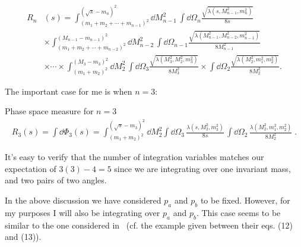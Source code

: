 \begin{equation}
\begin{aligned}
    R_n&(s) 
        = 
    \int_{(m_1 + m_2 + \cdots + m_{n-1})^2}^{(\sqrt{s} - m_n)^2}
    \dd M^2_{n-1} \,  \int \dd \Omega_n
    \frac{\sqrt{\lambda(s, M_{n-1}^2, m_n^2)}}{8s} \\
        &\times 
    \int_{(m_1 + m_2 + \cdots + m_{n-2})^2}^{(M_{n-1} - m_{n-1})^2}
    \dd M^2_{n-2}  \, \int \dd \Omega_{n-1}
    \frac{\sqrt{\lambda(M_{n-1}^2, M_{n-2}^2, m_{n-1}^2)}}{8M_{n-1}^2} \\
        &\times \cdots \times
    \int_{(m_1 + m_2)^2}^{(M_3 - m_3)^2}
    \dd M^2_{2}  \, \int \dd \Omega_{3}
    \frac{\sqrt{\lambda(M_{3}^2, M_{2}^2, m_{3}^2)}}{8M_{3}^2} 
    \times 
    \int \dd \Omega_2
    \frac{\sqrt{\lambda(M_{2}^2, m_1^2, m_{2}^2)}}{8M_{2}^2}. 
\end{aligned}
\end{equation}

The important case for me is when $n = 3$:
\begin{bluenv}{Phase space measure for $n = 3$}
\begin{equation}
    \label{eq:recursive-LIPS-3}
\begin{aligned}
    R_3(s) = \int \dd \Phi_3(s) = 
        \int_{(m_1 + m_2)^2}^{(\sqrt{s} - m_3)^2} \dd M_{2}^2 
        \int \dd \Omega_3 \,
        \frac{\lambda (s, M^2_{2}, m_3^2)}{8s} \,
        \int \dd \Omega_2 \,
        \frac{\lambda (M^2_2, m_1^2, m_2^2)}{8 M_2^2} \; .
\end{aligned}
\end{equation}
\end{bluenv}
It's easy to verify that the number of integration variables matches our expectation of $3(3) - 4 = 5$ since we are integrating over one invariant mass, and two pairs of two angles. 

In the above discussion we have considered $p_a$ and $p_b$ to be fixed.
However, for my purposes I will also be integrating over $p_a$ and $p_b$.
This case seems to be similar to the one considered in~\cite{Isaacson:2021xty} (cf. the example given between their eqs. (12) and (13)).


